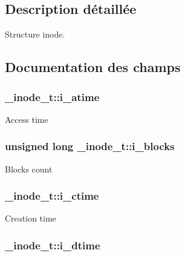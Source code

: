 \subsection{Description détaillée}
Structure inode. 

\subsection{Documentation des champs}
\hypertarget{struct__inode__t_a01f50c6c44a3b50e4414a794643b741f}{
\subsubsection[{i\-\_\-atime}]{ \-\_\-inode\-\_\-t\-::i\-\_\-atime}}\label{struct__inode__t_a01f50c6c44a3b50e4414a794643b741f}
Access time \hypertarget{struct__inode__t_a92ebe4c1e93af9fba4efae4d07e14858}{
\subsubsection[{i\-\_\-blocks}]{\setlength{\rightskip}{0pt plus 5cm}unsigned long \-\_\-inode\-\_\-t\-::i\-\_\-blocks}}\label{struct__inode__t_a92ebe4c1e93af9fba4efae4d07e14858}
Blocks count \hypertarget{struct__inode__t_a73ee1e604547b74b8e1045fd4f6699b6}{
\subsubsection[{i\-\_\-ctime}]{ \-\_\-inode\-\_\-t\-::i\-\_\-ctime}}\label{struct__inode__t_a73ee1e604547b74b8e1045fd4f6699b6}
Creation time \hypertarget{struct__inode__t_a393de4c58241168fdf397ab8421a3539}{
\subsubsection[{i\-\_\-dtime}]{ \-\_\-inode\-\_\-t\-::i\-\_\-dtime}}\label{struct__inode__t_a393de4c58241168fdf397ab8421a3539}
